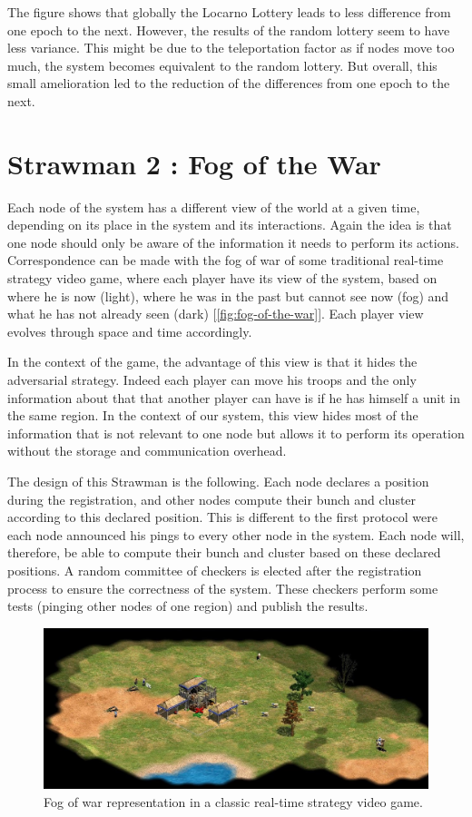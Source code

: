 \documentclass[a4paper,11pt,twoside=semi,openright]{report}
\begin{document}
The figure shows that globally the Locarno Lottery leads to less difference
from one epoch to the next. However, the results of the random lottery seem to
have less variance. This might be due to the teleportation factor as if nodes
move too much, the system becomes equivalent to the random lottery. But
overall, this small amelioration led to the reduction of the differences from
one epoch to the next.

\section{Strawman 2 : Fog of the War} \label{sec:Fog-of-the-war}

Each node of the system has a different view of the world at a given time, depending on its place in the system and its interactions. Again the idea is
that one node should only be aware of the information it needs to perform its
actions. Correspondence can be made with the fog of war of some traditional
real-time strategy video game, where each player have its view of the
system, based on where he is now (light), where he was in the past but cannot
see now (fog) and what he has not already seen (dark)
[\autoref{fig:fog-of-the-war}]. Each player view evolves through space and
time accordingly.

In the context of the game, the advantage of this view is
that it hides the adversarial strategy. Indeed each player can move his troops and the only information about that that another player can have is if he has himself a unit in the same region. In the context of our system, this view
hides most of the information that is not relevant to one node but allows it
to perform its operation without the storage and communication overhead. 

The design of this Strawman is the following. Each node declares a
position during the registration, and other nodes compute their bunch and
cluster according to this declared position. This is different to the first protocol were each node announced his pings to every other node in the system. Each node will, therefore, be able
to compute their bunch and cluster based on these declared positions. A random committee of checkers is elected after
the registration process to ensure
the correctness of the system. These checkers perform some tests (pinging other
nodes of one region) and publish the results. 

\begin{figure}[!h] 
\centering
\includegraphics[width=400pt]{figures/fog_of_war}
\caption{Fog of war representation in a classic real-time strategy video game. \cite{ageofempire1999} }
\label{fig:fog-of-the-war}
\end{figure}
\end{document}
